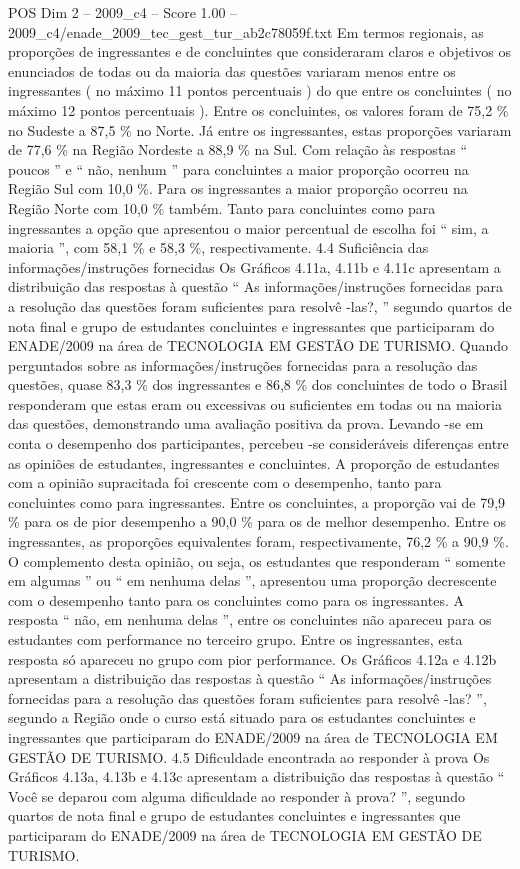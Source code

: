 \begin{textsample}{POS Dim 2 – 2009\_c4 – Score 1.00 – 2009\_c4/enade\_2009\_tec\_gest\_tur\_ab2c78059f.txt}
Em termos regionais, as proporções de ingressantes e de concluintes que consideraram claros e objetivos os enunciados de todas ou da maioria das questões variaram menos entre os ingressantes ( no máximo 11 pontos percentuais ) do que entre os concluintes ( no máximo 12 pontos percentuais ).
Entre os concluintes, os valores foram de 75,2 \% no Sudeste a 87,5 \% no Norte.
Já entre os ingressantes, estas proporções variaram de 77,6 \% na Região Nordeste a 88,9 \% na Sul.
Com relação às respostas “ poucos ” e “ não, nenhum ” para concluintes a maior proporção ocorreu na Região Sul com 10,0 \%.
Para os ingressantes a maior proporção ocorreu na Região Norte com 10,0 \% também.
Tanto para concluintes como para ingressantes a opção que apresentou o maior percentual de escolha foi “ sim, a maioria ”, com 58,1 \% e 58,3 \%, respectivamente. 4.4 Suficiência das informações/instruções fornecidas Os Gráficos 4.11a, 4.11b e 4.11c apresentam a distribuição das respostas à questão “ As informações/instruções fornecidas para a resolução das questões foram suficientes para resolvê -las?, ” segundo quartos de nota final e grupo de estudantes concluintes e ingressantes que participaram do ENADE/2009 na área de TECNOLOGIA EM GESTÃO DE TURISMO.
Quando perguntados sobre as informações/instruções fornecidas para a resolução das questões, quase 83,3 \% dos ingressantes e 86,8 \% dos concluintes de todo o Brasil responderam que estas eram ou excessivas ou suficientes em todas ou na maioria das questões, demonstrando uma avaliação positiva da prova.
Levando -se em conta o desempenho dos participantes, percebeu -se consideráveis diferenças entre as opiniões de estudantes, ingressantes e concluintes.
A proporção de estudantes com a opinião supracitada foi crescente com o desempenho, tanto para concluintes como para ingressantes.
Entre os concluintes, a proporção vai de 79,9 \% para os de pior desempenho a 90,0 \% para os de melhor desempenho.
Entre os ingressantes, as proporções equivalentes foram, respectivamente, 76,2 \% a 90,9 \%.
O complemento desta opinião, ou seja, os estudantes que responderam “ somente em algumas ” ou “ em nenhuma delas ”, apresentou uma proporção decrescente com o desempenho tanto para os concluintes como para os ingressantes.
A resposta “ não, em nenhuma delas ”, entre os concluintes não apareceu para os estudantes com performance no terceiro grupo.
Entre os ingressantes, esta resposta só apareceu no grupo com pior performance.
Os Gráficos 4.12a e 4.12b apresentam a distribuição das respostas à questão “ As informações/instruções fornecidas para a resolução das questões foram suficientes para resolvê -las? ”, segundo a Região onde o curso está situado para os estudantes concluintes e ingressantes que participaram do ENADE/2009 na área de TECNOLOGIA EM GESTÃO DE TURISMO. 4.5 Dificuldade encontrada ao responder à prova Os Gráficos 4.13a, 4.13b e 4.13c apresentam a distribuição das respostas à questão “ Você se deparou com alguma dificuldade ao responder à prova? ”, segundo quartos de nota final e grupo de estudantes concluintes e ingressantes que participaram do ENADE/2009 na área de TECNOLOGIA EM GESTÃO DE TURISMO.

\end{textsample}
